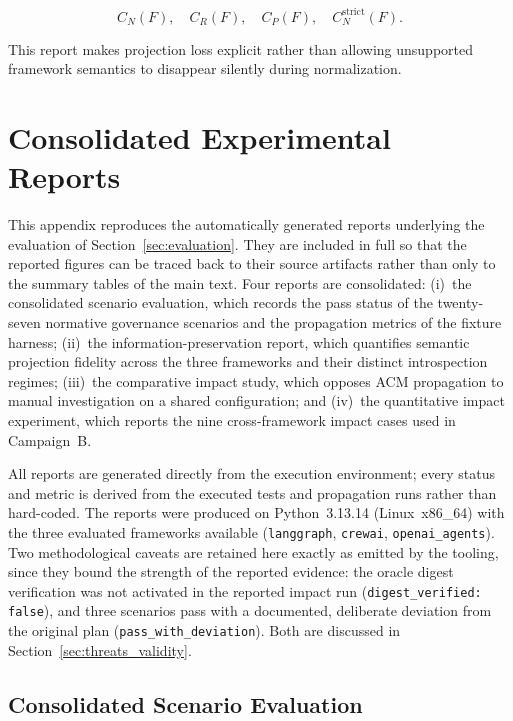 \documentclass[10pt]{article}
\begin{document}
\[
C_N(F),\quad
C_R(F),\quad
C_P(F),\quad
C_N^{\mathrm{strict}}(F).
\]

This report makes projection loss explicit rather than allowing unsupported
framework semantics to disappear silently during normalization.

\section{Consolidated Experimental Reports}
\label{app:experimental-reports}

This appendix reproduces the automatically generated reports underlying
the evaluation of Section~\ref{sec:evaluation}. They are included in full so that the reported figures can be traced back to their source
artifacts rather than only to the summary tables of the main text. Four
reports are consolidated: (i)~the consolidated scenario evaluation, which records the pass status of the twenty-seven normative governance
scenarios and the propagation metrics of the fixture harness;
(ii)~the information-preservation report, which quantifies semantic
projection fidelity across the three frameworks and their distinct
introspection regimes; (iii)~the comparative impact study, which opposes
ACM propagation to manual investigation on a shared configuration; and
(iv)~the quantitative impact experiment, which reports the nine
cross-framework impact cases used in Campaign~B.

All reports are generated directly from the execution environment; every
status and metric is derived from the executed tests and propagation
runs rather than hard-coded. The reports were produced on Python~3.13.14
(Linux~x86\_64) with the three evaluated frameworks available
(\texttt{langgraph}, \texttt{crewai}, \texttt{openai\_agents}). Two
methodological caveats are retained here exactly as emitted by the
tooling, since they bound the strength of the reported evidence: the
oracle digest verification was not activated in the reported impact run
(\texttt{digest\_verified: false}), and three scenarios pass with a
documented, deliberate deviation from the original plan
(\texttt{pass\_with\_deviation}). Both are discussed in
Section~\ref{sec:threats_validity}.

\subsection{Consolidated Scenario Evaluation}
\label{app:report-evaluation}
\end{document}
